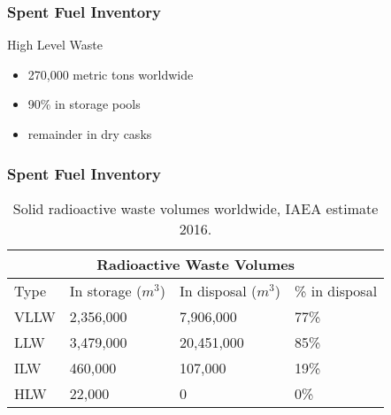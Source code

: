 \begin{frame}[fragile]
        \frametitle{Spent Fuel Inventory}
\begin{block}{High Level Waste}
        \begin{itemize}
                \item 270,000 metric tons worldwide
                \item 90\% in storage pools 
                \item remainder in dry casks
        \end{itemize}
                
        \end{block}
\end{frame}

\begin{frame}[fragile]
        \frametitle{Spent Fuel Inventory}
    \begin{table}
      \centering
      \begin{tabular}{l|lll}
        \multicolumn{4}{c}{\textbf{Radioactive Waste Volumes}}\\
        \hline
Type & In storage ($m^3$) & In disposal ($m^3$)  &  \% in disposal\\
        \hline
VLLW &   2,356,000 &   7,906,000  &  77\%\\
LLW  &  3,479,000  &  20,451,000 &   85\%\\
ILW  &  460,000  &  107,000  &  19\%\\
HLW  &  22,000 &   0   & 0\%\\
        \hline
      \end{tabular}
      \caption[SNF volumes]{Solid radioactive waste volumes worldwide, IAEA 
      estimate 2016. \cite{iaea}}
      \label{tab:vol}
    \end{table}
    \end{frame}


